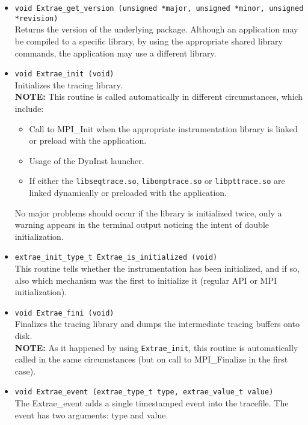 \begin{itemize}

 \item {\tt void Extrae\_get\_version (unsigned *major, unsigned *minor, unsigned *revision)}\\
 Returns the version of the underlying \TRACE package. Although an application may be compiled to a specific \TRACE library, by using the appropriate shared library commands, the application may use a different \TRACE library.

 \item {\tt void Extrae\_init (void)}\\
 Initializes the tracing library.\\
 {\bf NOTE:} This routine is called automatically in different circumstances, which include:
    \begin{itemize}
      \item Call to MPI\_Init when the appropriate instrumentation library is linked or preload with the application.
      \item Usage of the DynInst launcher.
      \item If either the {\tt libseqtrace.so}, {\tt libomptrace.so} or {\tt libpttrace.so} are linked dynamically or preloaded with the application.
    \end{itemize}
  No major problems should occur if the library is initialized twice, only a warning appears in the terminal output noticing the intent of double initialization.

 \item {\tt extrae\_init\_type\_t Extrae\_is\_initialized (void)}\\
 This routine tells whether the instrumentation has been initialized, and if so, also which mechanism was the first to initialize it (regular API or MPI initialization).

 \item {\tt void Extrae\_fini (void)}\\
 Finalizes the tracing library and dumps the intermediate tracing buffers onto disk.\\
 {\bf NOTE:} As it happened by using {\tt Extrae\_init}, this routine is automatically called in the same circumstances (but on call to MPI\_Finalize in the first case).

 \item {\tt void Extrae\_event (extrae\_type\_t type, extrae\_value\_t value)}\\
 The Extrae\_event adds a single timestamped event into the tracefile. The event has two arguments: type and value.


\end{itemize}
